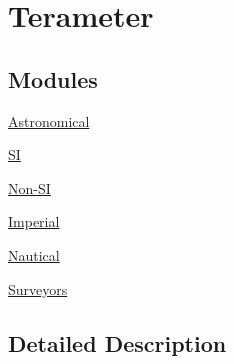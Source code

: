 \hypertarget{group___e_g_x_math-_conversions-_length_conversions-_terameter}{}\section{Terameter}
\label{group___e_g_x_math-_conversions-_length_conversions-_terameter}
\subsection*{Modules}
\begin{DoxyCompactItemize}
\item 
\mbox{\hyperlink{group___e_g_x_math-_conversions-_length_conversions-_terameter-_astronomical}{Astronomical}}
\item 
\mbox{\hyperlink{group___e_g_x_math-_conversions-_length_conversions-_terameter-_s_i}{SI}}
\item 
\mbox{\hyperlink{group___e_g_x_math-_conversions-_length_conversions-_terameter-_non-_s_i}{Non-\/\+SI}}
\item 
\mbox{\hyperlink{group___e_g_x_math-_conversions-_length_conversions-_terameter-_imperial}{Imperial}}
\item 
\mbox{\hyperlink{group___e_g_x_math-_conversions-_length_conversions-_terameter-_nautical}{Nautical}}
\item 
\mbox{\hyperlink{group___e_g_x_math-_conversions-_length_conversions-_terameter-_surveyors}{Surveyors}}
\end{DoxyCompactItemize}


\subsection{Detailed Description}
